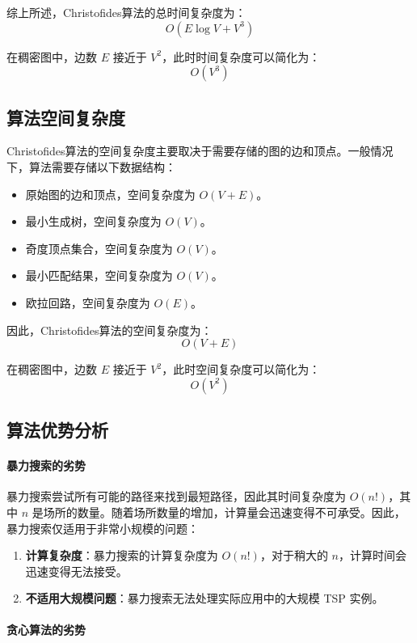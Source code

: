 \documentclass{report}
\begin{document}
综上所述，Christofides算法的总时间复杂度为：
\[ O(E \log V + V^3) \]

在稠密图中，边数 $E$ 接近于 $V^2$，此时时间复杂度可以简化为：
\[ O(V^3) \]

\subsection{算法空间复杂度}

Christofides算法的空间复杂度主要取决于需要存储的图的边和顶点。一般情况下，算法需要存储以下数据结构：

\begin{itemize}
    \item 原始图的边和顶点，空间复杂度为 $O(V + E)$。
    \item 最小生成树，空间复杂度为 $O(V)$。
    \item 奇度顶点集合，空间复杂度为 $O(V)$。
    \item 最小匹配结果，空间复杂度为 $O(V)$。
    \item 欧拉回路，空间复杂度为 $O(E)$。
\end{itemize}

因此，Christofides算法的空间复杂度为：
\[ O(V + E) \]

在稠密图中，边数 $E$ 接近于 $V^2$，此时空间复杂度可以简化为：
\[ O(V^2) \]

\subsection{算法优势分析}

\paragraph{暴力搜索的劣势}

暴力搜索尝试所有可能的路径来找到最短路径，因此其时间复杂度为 $O(n!)$，其中 $n$ 是场所的数量。随着场所数量的增加，计算量会迅速变得不可承受。因此，暴力搜索仅适用于非常小规模的问题：

\begin{enumerate}
    \item \textbf{计算复杂度}：暴力搜索的计算复杂度为 $O(n!)$，对于稍大的 $n$，计算时间会迅速变得无法接受。
    \item \textbf{不适用大规模问题}：暴力搜索无法处理实际应用中的大规模 TSP 实例。
\end{enumerate}

\paragraph{贪心算法的劣势}
\end{document}
